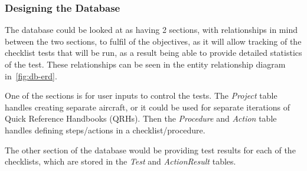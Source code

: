 \documentclass[../dissertation.tex]{subfiles}
\begin{document}
\subsubsection{Designing the Database}


The database could be looked at as having 2 sections, with relationships in mind
between the two sections, to fulfil of the objectives, as it will allow tracking
of the checklist tests that will be run, as a result being able to provide detailed
statistics of the test. These relationships can be seen in the entity relationship
diagram in~\autoref{fig:db-erd}.

One of the sections is for user inputs to control the tests.
The \textit{Project} table handles creating separate aircraft, or it could be used for
separate iterations of Quick Reference Handbooks (QRHs).
Then the \textit{Procedure} and \textit{Action} table handles defining
steps/actions in a checklist/procedure.

The other section of the database would be providing test results for each of the
checklists, which are stored in the \textit{Test} and \textit{ActionResult} tables.
\end{document}
